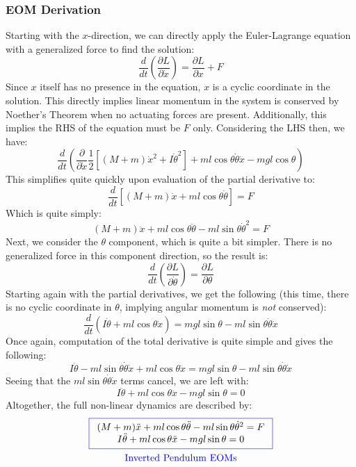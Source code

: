 \subsubsection{EOM Derivation}
Starting with the $x$-direction, we can directly apply the Euler-Lagrange equation with a generalized force to find the solution:
$$\frac{d}{dt}\left(\frac{\partial L}{\partial \dot{x}}\right)=\frac{\partial L}{\partial x}+F$$
Since $x$ itself has no presence in the equation,  $x$ is a cyclic coordinate in the solution. This directly implies linear momentum in the system is conserved by Noether's Theorem when no actuating forces are present. Additionally, this implies the RHS of the equation must be $F$ only. Considering the LHS then, we have:
$$\frac{d}{dt}\left(\frac{\partial}{\partial \dot{x}}\frac{1}{2}\left[\left(M+m\right)\dot{x}^2+I\dot{\theta}^2\right]+ml\cos\theta\dot{\theta}\dot{x}-mgl\cos{\theta}\right)$$
This simplifies quite quickly upon evaluation of the partial derivative to:
$$\frac{d}{dt}\left[\left(M+m\right)\dot{x}+ml\cos\theta\dot\theta\right]=F$$
Which is quite simply:
$$(M+m)\ddot{x}+ml\cos\theta\ddot{\theta}-ml\sin\theta\dot{\theta}^2=F$$
Next, we consider the $\theta$ component, which is quite a bit simpler. There is no generalized force in this component direction, so the result is:
$$\frac{d}{dt}\left(\frac{\partial L}{\partial \dot{\theta}}\right)=\frac{\partial L}{\partial \theta}$$
Starting again with the partial derivatives, we get the following (this time, there is no cyclic coordinate in $\theta$, implying angular momentum is \textit{not} conserved):
$$\frac{d}{dt}\left(I\dot{\theta}+ml\cos\theta\dot{x}\right)=mgl\sin\theta-ml\sin\theta\dot{\theta}\dot{x}$$
Once again, computation of the total derivative is quite simple and gives the following:
$$I\ddot{\theta}-ml\sin\theta\dot{\theta}\dot{x}+ml\cos\theta\ddot{x}=mgl\sin\theta-ml\sin\theta\dot{\theta}\dot{x}$$
Seeing that the $ml\sin\theta\dot{\theta}\dot{x}$ terms cancel, we are left with:
$$I\ddot{\theta}+ml\cos\theta\ddot{x}-mgl\sin\theta=0$$
Altogether, the full non-linear dynamics are described by:
\begin{gather}\label{eq:inverted pend eom}
\color{blue}\boxed{\color{black}
\begin{array}{c}
     (M+m)\ddot{x}+ml\cos\theta\ddot{\theta}-ml\sin\theta\dot{\theta}^2=F \\I\ddot{\theta}+ml\cos\theta\ddot{x}-mgl\sin\theta=0
\end{array}
}
  \\\color{blue}\mathrm{Inverted \ Pendulum \ EOMs}  
\end{gather}
